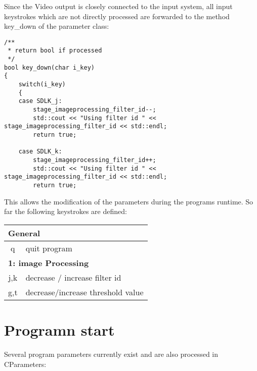 \documentclass[11pt,a4paper]{article}
\begin{document}
Since the Video output is closely connected to the input system, all
input keystrokes which are not directly processed are forwarded to the method
key\_down of the parameter class:

\begin{lstlisting}
/**
 * return bool if processed
 */
bool key_down(char i_key)
{
	switch(i_key)
	{
	case SDLK_j:
		stage_imageprocessing_filter_id--;
		std::cout << "Using filter id " << stage_imageprocessing_filter_id << std::endl;
		return true;

	case SDLK_k:
		stage_imageprocessing_filter_id++;
		std::cout << "Using filter id " << stage_imageprocessing_filter_id << std::endl;
		return true;
\end{lstlisting}

\noindent
This allows the modification of the parameters during the programs runtime.
So far the following keystrokes are defined:

\noindent
\begin{tabular}{|c|l|}
	\hline
	\multicolumn{2}{|l|}{\textbf{General}}	\\
	\hline
	q & quit program	\\
	\hline
	\hline

	\multicolumn{2}{|l|}{\textbf{1: image Processing}}	\\
	\hline
	j,k & decrease / increase filter id\\
	\hline
	g,t & decrease/increase threshold value\\
	\hline
\end{tabular}


\section{Programn start}

Several program parameters currently exist and are also processed in
CParameters:
\end{document}
